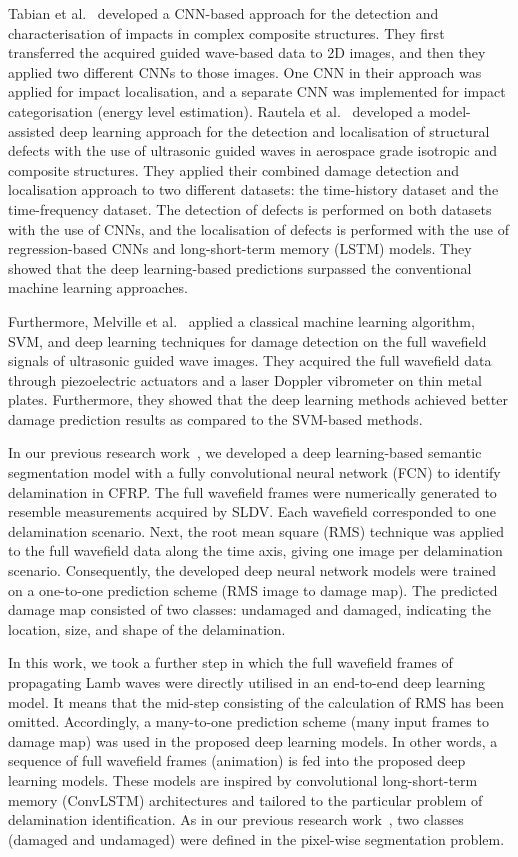 \begin{sloppypar}
	Tabian et al.~\cite{Tabian2019} developed a CNN-based approach for the detection and characterisation of impacts in complex composite structures.
	They first transferred the acquired guided wave-based data to 2D images, and then they applied two different CNNs to those images.
	One CNN in their approach was applied for impact localisation, and a separate CNN was implemented for impact categorisation (energy level estimation).
	Rautela et al.~\cite{rautela2021ultrasonic} developed a model-assisted deep learning approach for the detection and localisation of structural defects with the use of ultrasonic guided waves in aerospace grade isotropic and composite structures. 
	They applied their combined damage detection and localisation approach to two different datasets: the time-history dataset and the time-frequency dataset. 
	The detection of defects is performed on both datasets with the use of CNNs, and the localisation of defects is performed with the use of regression-based CNNs and long-short-term memory (LSTM) models. 
	They showed that the deep learning-based predictions surpassed the conventional machine learning approaches.
	
	Furthermore, Melville et al.~\cite{Melville2018} applied a classical machine learning algorithm, SVM, and deep learning techniques for damage detection on the full wavefield signals of ultrasonic guided wave images.
	They acquired the full wavefield data through piezoelectric actuators and a laser Doppler vibrometer on thin metal plates.
	Furthermore, they showed that the deep learning methods achieved better damage prediction results as compared to the SVM-based methods.
	
	In our previous research work~\cite{Ijjeh2021}, we developed a deep learning-based semantic segmentation model with a fully convolutional neural network (FCN) to identify delamination in CFRP.
	The full wavefield frames were numerically generated to resemble measurements acquired by SLDV.
	Each wavefield corresponded to one delamination scenario.
	Next, the root mean square (RMS) technique was applied to the full wavefield data along the time axis, giving one image per delamination scenario.
	Consequently, the developed deep neural network models were trained on a one-to-one prediction scheme (RMS image to damage map).
	The predicted damage map consisted of two classes: undamaged and damaged, indicating the location, size, and shape of the delamination.
	
	In this work, we took a further step in which the full wavefield frames of propagating Lamb waves were directly utilised in an end-to-end
	deep learning model.
	It means that the mid-step consisting of the calculation of RMS has been omitted.
	Accordingly, a many-to-one prediction scheme (many input frames to damage map) was used in the proposed deep learning models.
	In other words, a sequence of full wavefield frames (animation) is fed into the proposed deep learning models.
	These models are inspired by convolutional long-short-term memory (ConvLSTM) architectures and tailored to the particular problem of delamination identification.
	As in our previous research work~\cite{Ijjeh2021, Ijjeh2022}, two classes (damaged and undamaged) were defined in the pixel-wise segmentation problem.
	

\end{sloppypar}
